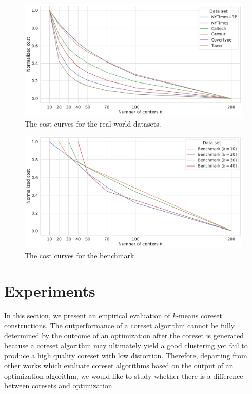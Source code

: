 
\begin{figure}
  \caption{The cost curves for the real-world datasets.}
  \label{fig:cost-curves-real-world-datasets}
  \includegraphics[width=1\linewidth]{figures/cost-curves-real-world-datasets.pdf}
\end{figure}


\begin{figure}
  \caption{The cost curves for the benchmark.}
  \label{fig:cost-curves-benchmark}
  \includegraphics[width=1\linewidth]{figures/cost-curves-benchmark.pdf}
\end{figure}


\section{Experiments} \label{sec:experiments}
In this section, we present an empirical evaluation of $k$-means coreset constructions.
The outperformance of a coreset algorithm cannot be fully determined by the outcome of an optimization after the coreset is generated because a coreset algorithm may ultimately yield a good clustering yet fail to produce a high quality coreset with low distortion.
Therefore, departing from other works which evaluate coreset algorithms based on the output of an optimization algorithm, we would like to study whether there is a difference between coresets and optimization.

